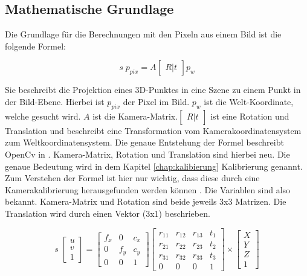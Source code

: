 	\subsection{Mathematische Grundlage}
	Die Grundlage für die Berechnungen mit den Pixeln aus einem Bild ist die folgende Formel:
	
	\begin{equation}
	s \; p_{pix} = A \begin{bmatrix} R|t \end{bmatrix} p_w
	\label{eq:basic_trans}
	\end{equation}
	
	Sie beschreibt die Projektion eines 3D-Punktes in eine Szene zu einem Punkt in der Bild-Ebene. Hierbei ist \( p_{pix} \) der Pixel im Bild. \( p_w \) ist die Welt-Koordinate, welche gesucht wird. \( A \) ist die Kamera-Matrix.\( \begin{bmatrix} R|t \end{bmatrix} \) ist eine Rotation und Translation und beschreibt eine Transformation vom Kamerakoordinatensystem zum Weltkoordinatensystem. Die genaue Entstehung der Formel beschreibt OpenCv in \citep[Vgl.][]{noauthor_opencv_nodate-2}. Kamera-Matrix, Rotation und Translation sind hierbei neu. Die genaue Bedeutung wird in dem Kapitel \ref{chap:kalibierung} Kalibrierung genannt. Zum Verstehen der Formel ist hier nur wichtig, dass diese durch eine Kamerakalibrierung herausgefunden werden können \citep[Vgl.][]{dawson-howe_simple_1994}. Die Variablen sind also bekannt. Kamera-Matrix und Rotation sind beide jeweils 3x3 Matrizen. Die Translation wird durch einen Vektor (3x1) beschrieben. 
	
	\begin{equation}
	s \; \begin{bmatrix}
	u \\ 
	v \\ 
	1
	\end{bmatrix} = \begin{bmatrix}
	f_x & 0 & c_x \\
	0 & f_y & c_y \\
	0 & 0 & 1
	\end{bmatrix} \begin{bmatrix}
	r_{11} & r_{12} & r_{13} & t_1 \\ 
	r_{21} & r_{22} & r_{23} & t_2 \\ 
	r_{31} & r_{32} & r_{33} & t_3 \\
	0 & 0 & 0 & 1
	\end{bmatrix} \times \begin{bmatrix}
	X \\ 
	Y \\ 
	Z \\
	1
	\end{bmatrix}
	\label{eq:basic_trans_complete}
	\end{equation}
	
